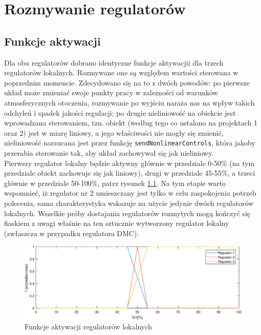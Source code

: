 \chapter{Rozmywanie regulatorów}

\section{Funkcje aktywacji}

Dla obu regulatorów dobrano identyczne funkcje aktywacjii dla trzech regulatorów lokalnych. Rozmywane one są względem wartości sterowana w poprzednim momencie. Zdecydowano się na to z dwóch powodów: po pierwsze układ może zmieniać swoje punkty pracy w zależności od warunków atmosferycznych otoczenia, rozmywanie po wyjściu naraża nas na wpływ takich odchyleń i spadek jakości regulacji; po drugie nieliniowość na obiekcie jest wprowadzana sterowaniem, tzn. obiekt (według tego co ustalono na projektach 1 oraz 2) jest w miarę liniowy, a jego właściwości nie mogły się zmienić, nieliniowość narzucana jest przez funkcję \verb|sendNonlinearControls|, która jakoby przerabia sterowanie tak, aby układ zachowywał się jak nieliniowy. \\

Pierwszy regulator lokalny będzie aktywny głównie w przedziale 0-50\% (na tym przedziale obiekt zachowuje się jak liniowy), drugi w przedziale 45-55\%, a trzeci głównie w przedziale 50-100\%, patrz rysunek \ref{fun_przyn}. Na tym etapie warto wspomnieć, iż regulator nr 2 umieszczany jest tylko w celu zaspokojenia potrzeb polecenia, sama charakterystyka wskazuje na użycie jedynie dwóch regulatorów lokalnych. Wszelkie próby dostajania regulatorów rozmytych mogą kończyć się fiaskiem z uwagi właśnie na ten sztucznie wytworzony regulator lokalny (zwłaszcza w przypadku regulatora DMC).

\begin{figure}[h!]
	\centering
	\includegraphics[scale=0.75]{Rys/Przynaleznosc.eps}
	\caption{Funkcje aktywacji regulatorów lokalnych}
	\label{fun_przyn}
\end{figure}

